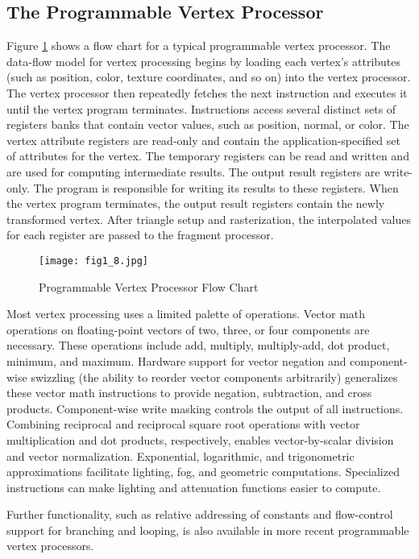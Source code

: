 \documentclass[../main.tex]{subfiles}
\begin{document}
\subsection*{The Programmable Vertex Processor}

Figure \ref{fig:1-8} shows a flow chart for a typical programmable vertex processor. The data-flow model for vertex processing begins by loading each vertex's attributes (such as position, color, texture coordinates, and so on) into the vertex processor. The vertex processor then repeatedly fetches the next instruction and executes it until the vertex program terminates. Instructions access several distinct sets of registers banks that contain vector values, such as position, normal, or color. The vertex attribute registers are read-only and contain the application-specified set of attributes for the vertex. The temporary registers can be read and written and are used for computing intermediate results. The output result registers are write-only. The program is responsible for writing its results to these registers. When the vertex program terminates, the output result registers contain the newly transformed vertex. After triangle setup and rasterization, the interpolated values for each register are passed to the fragment processor.

\begin{figure}
    \centering
    \texttt{[image: fig1\_8.jpg]}
    \caption{Programmable Vertex Processor Flow Chart}
    \label{fig:1-8}
\end{figure}

Most vertex processing uses a limited palette of operations. Vector math operations on floating-point vectors of two, three, or four components are necessary. These operations include add, multiply, multiply-add, dot product, minimum, and maximum. Hardware support for vector negation and component-wise swizzling (the ability to reorder vector components arbitrarily) generalizes these vector math instructions to provide negation, subtraction, and cross products. Component-wise write masking controls the output of all instructions. Combining reciprocal and reciprocal square root operations with vector multiplication and dot products, respectively, enables vector-by-scalar division and vector normalization. Exponential, logarithmic, and trigonometric approximations facilitate lighting, fog, and geometric computations. Specialized instructions can make lighting and attenuation functions easier to compute.

Further functionality, such as relative addressing of constants and flow-control support for branching and looping, is also available in more recent programmable vertex processors.
\end{document}
